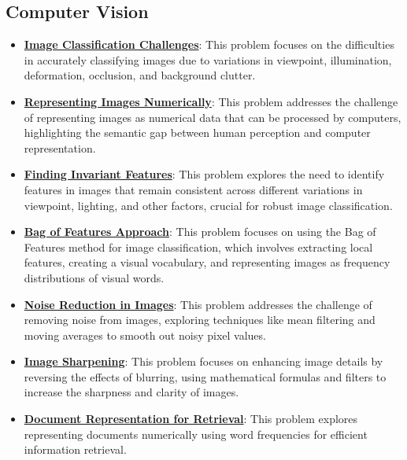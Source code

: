 \documentclass{article}%
\begin{document}
\subsection{Computer Vision}%
\label{subsec:ComputerVision}%
\begin{itemize}[leftmargin=*]%
\item \href{https://www.math.purdue.edu/~yipn/351/07L2-Vision.pdf#page=4}{\textbf{Image Classification Challenges}}: This problem focuses on the difficulties in accurately classifying images due to variations in viewpoint, illumination, deformation, occlusion, and background clutter.%
\item \href{https://www.math.purdue.edu/~yipn/351/07L2-Vision.pdf#page=4}{\textbf{Representing Images Numerically}}: This problem addresses the challenge of representing images as numerical data that can be processed by computers, highlighting the semantic gap between human perception and computer representation.%
\item \href{https://www.math.purdue.edu/~yipn/351/07L2-Vision.pdf#page=11}{\textbf{Finding Invariant Features}}: This problem explores the need to identify features in images that remain consistent across different variations in viewpoint, lighting, and other factors, crucial for robust image classification.%
\item \href{https://www.math.purdue.edu/~yipn/351/07L2-Vision.pdf#page=12}{\textbf{Bag of Features Approach}}: This problem focuses on using the Bag of Features method for image classification, which involves extracting local features, creating a visual vocabulary, and representing images as frequency distributions of visual words.%
\item \href{https://www.math.purdue.edu/~yipn/351/07L2-Vision.pdf#page=35}{\textbf{Noise Reduction in Images}}: This problem addresses the challenge of removing noise from images, exploring techniques like mean filtering and moving averages to smooth out noisy pixel values.%
\item \href{https://www.math.purdue.edu/~yipn/351/07L2-Vision.pdf#page=52}{\textbf{Image Sharpening}}: This problem focuses on enhancing image details by reversing the effects of blurring, using mathematical formulas and filters to increase the sharpness and clarity of images.%
\item \href{https://www.math.purdue.edu/~yipn/351/07L2-Vision.pdf#page=20}{\textbf{Document Representation for Retrieval}}: This problem explores representing documents numerically using word frequencies for efficient information retrieval.%
\end{itemize}
\end{document}
